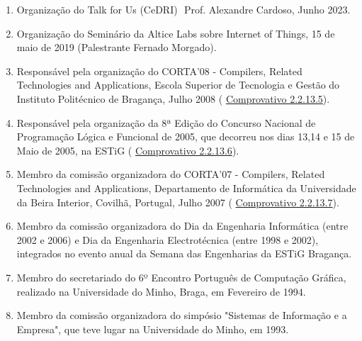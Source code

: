 \documentclass[11pt]{article}
\begin{document}
\begin{enumerate}
\item{Organização do Talk for Us (CeDRI)  Prof. Alexandre Cardoso, Junho 2023.}
\item{Organização do Seminário da Altice Labs sobre Internet of Things, 15 de maio de 2019 (Palestrante Fernado Morgado).}
\item{Responsável pela organização do CORTA'08 - Compilers, Related Technologies and Applications, Escola Superior de Tecnologia e Gestão do Instituto Politécnico de Bragança, Julho 2008 (
\href{run:ComprovativosCOCP/COCPCoRTA08.pdf}{Comprovativo 2.2.13.5}).}
\item{Responsável pela organização da 8ª Edição do Concurso Nacional de Programação Lógica e Funcional de 2005, que decorreu nos dias 13,14 e 15 de Maio de 2005, na ESTiG (
\href{run:ComprovativosCOCP/COCNPLF05.pdf}{Comprovativo 2.2.13.6}).}
\item{Membro da comissão organizadora do CORTA'07 - Compilers, Related Technologies and Applications, Departamento de Informática da Universidade da Beira Interior, Covilhã, Portugal, Julho 2007 (
\href{run:ComprovativosCOCP/COCoRTA2007.pdf}{Comprovativo 2.2.13.7}).}
\item{Membro da comissão organizadora do Dia da Engenharia Informática (entre 2002 e 2006) e Dia da Engenharia Electrotécnica (entre 1998 e 2002), integrados no evento anual da Semana das Engenharias da ESTiG Bragança.}
\item{Membro do secretariado do 6º Encontro Português de Computação Gráfica, realizado na Universidade do Minho, Braga, em Fevereiro de 1994. }
\item{Membro da comissão organizadora do simpósio "Sistemas de Informação e a Empresa", que teve lugar na Universidade do Minho, em 1993. }
\end{enumerate}
\end{document}

